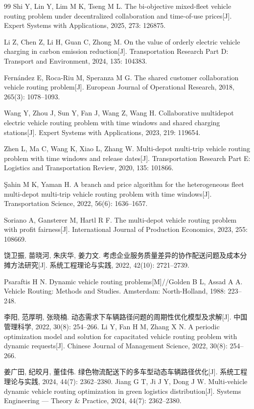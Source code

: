 \documentclass{setp-new}
\begin{document}
\begin{thebibliography}{99}
 Shi Y, Lin Y, Lim M K, Tseng M L. The bi-objective mixed-fleet vehicle routing problem under decentralized collaboration and time-of-use prices[J]. Expert Systems with Applications, 2025, 273: 126875.


 Li Z, Chen Z, Li H, Guan C, Zhong M. On the value of orderly electric vehicle charging in carbon emission reduction[J]. Transportation Research Part D: Transport and Environment, 2024, 135: 104383.


 Fern\'{a}ndez E, Roca-Riu M, Speranza M G. The shared customer collaboration vehicle routing problem[J]. European Journal of Operational Research, 2018, 265(3): 1078--1093.


 Wang Y, Zhou J, Sun Y, Fan J, Wang Z, Wang H. Collaborative multidepot electric vehicle routing problem with time windows and shared charging stations[J]. Expert Systems with Applications, 2023, 219: 119654.


 Zhen L, Ma C, Wang K, Xiao L, Zhang W. Multi-depot multi-trip vehicle routing problem with time windows and release dates[J]. Transportation Research Part E: Logistics and Transportation Review, 2020, 135: 101866.


 Şahin M K, Yaman H. A branch and price algorithm for the heterogeneous fleet multi-depot multi-trip vehicle routing problem with time windows[J]. Transportation Science, 2022, 56(6): 1636--1657.

 Soriano A, Gansterer M, Hartl R F. The multi-depot vehicle routing problem with profit fairness[J]. International Journal of Production Economics, 2023, 255: 108669.


 饶卫振, 苗晓河, 朱庆华, 姜力文. 考虑企业服务质量差异的协作配送问题及成本分摊方法研究[J]. 系统工程理论与实践, 2022, 42(10): 2721--2739.


 Psaraftis H N. Dynamic vehicle routing problems[M]//Golden B L, Assad A A. Vehicle Routing: Methods and Studies. Amsterdam: North-Holland, 1988: 223--248.


 李阳, 范厚明, 张晓楠. 动态需求下车辆路径问题的周期性优化模型及求解[J]. 中国管理科学, 2022, 30(8): 254--266.\newline
Li Y, Fan H M, Zhang X N. A periodic optimization model and solution for capacitated vehicle routing problem with dynamic requests[J]. Chinese Journal of Management Science, 2022, 30(8): 254--266.


 姜广田, 纪皎月, 董佳伟. 绿色物流配送下的多车型动态车辆路径优化[J]. 系统工程理论与实践, 2024, 44(7): 2362--2380.\newline
Jiang G T, Ji J Y, Dong J W. Multi-vehicle dynamic vehicle routing optimization in green logistics distribution[J]. Systems Engineering --- Theory \& Practice, 2024, 44(7): 2362--2380.



\end{thebibliography}
\end{document}
